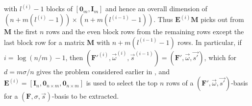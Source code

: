  with $l^{\left(i\right)}-1$ blocks of $\left[\mathbf{0}_{m},\mathbf{I}_{m}\right]$
and hence an overall dimension of $(n+m(l^{\left(i\right)}-1))\times(n+m(l^{\left(i-1\right)}-1))$.
Thus $\mathbf{E}^{\left(i\right)}\mathbf{M}$ picks out from $\mathbf{M}$
the first $n$ rows and the even block rows from the remaining rows
except the last block row for a matrix $\mathbf{M}$ with $n+m(l^{\left(i-1\right)}-1)$
rows. In particular, if $i=\log\left(n/m\right)-1$, then $(\mathbf{F}'^{\left(i\right)},\vec{\omega}^{\left(i\right)},\vec{s}^{\left(i-1\right)})=(\mathbf{F}',\vec{\omega},\vec{s'})$,
which for $d=m\sigma/n$ gives the problem considered earlier in ,
and $\mathbf{E}^{\left(i\right)}=\left[\mathbf{I}_{n},\mathbf{0}_{n\times m},\mathbf{0}_{n\times m}\right]$
is used to select the top $n$ rows of a $(\mathbf{F}',\vec{\omega},\vec{s'})$-basis
for a $\left(\mathbf{F},\sigma,\vec{s}\right)$-basis to be extracted.

